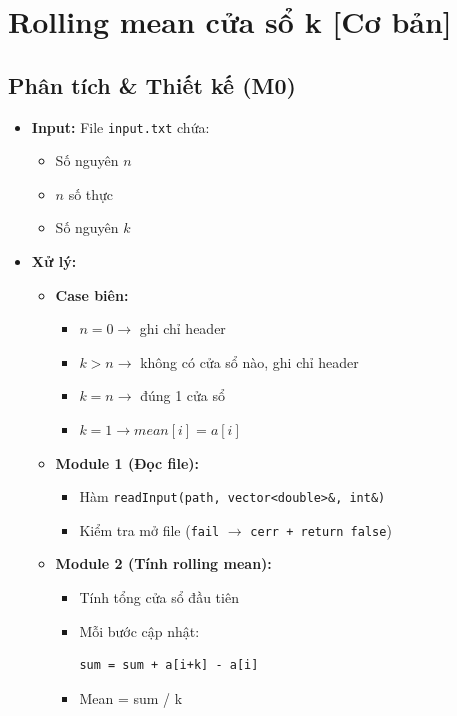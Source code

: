 \section{Rolling mean cửa sổ k [Cơ bản]}
\subsection{Phân tích \& Thiết kế (M0)}
\begin{itemize}
    \item \textbf{Input:}
    File \texttt{input.txt} chứa:
    \begin{itemize}
        \item Số nguyên $n$
        \item $n$ số thực
        \item Số nguyên $k$
    \end{itemize}

    \item \textbf{Xử lý:}
    \begin{itemize}
        \item \textbf{Case biên:}
        \begin{itemize}
            \item $n = 0 \rightarrow$ ghi chỉ header
            \item $k > n \rightarrow$ không có cửa sổ nào, ghi chỉ header
            \item $k = n \rightarrow$ đúng 1 cửa sổ
            \item $k = 1 \rightarrow mean[i] = a[i]$
        \end{itemize}

        \item \textbf{Module 1 (Đọc file):}
        \begin{itemize}
            \item Hàm \texttt{readInput(path, vector<double>\&, int\&)}
            \item Kiểm tra mở file (\texttt{fail} $\rightarrow$ \texttt{cerr + return false})
        \end{itemize}

        \item \textbf{Module 2 (Tính rolling mean):}
        \begin{itemize}
            \item Tính tổng cửa sổ đầu tiên
            \item Mỗi bước cập nhật:
\begin{lstlisting}
sum = sum + a[i+k] - a[i]
\end{lstlisting}
            \item Mean = sum / k
        \end{itemize}


\end{itemize}
\end{itemize}
